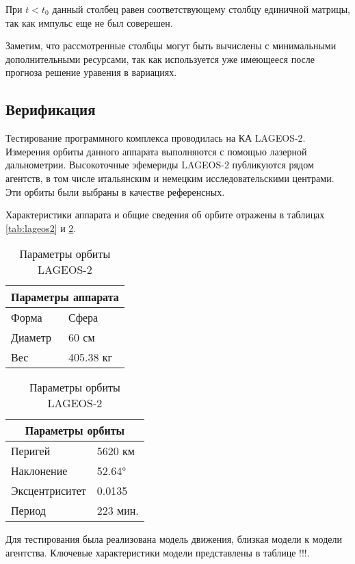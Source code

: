 При $t < t_0$ данный столбец равен соответствующему столбцу единичной матрицы, 
так как импульс еще не был соверешен.

Заметим, что рассмотренные столбцы могут быть вычислены с минимальными дополнительными
ресурсами, так как используется уже имеющееся после прогноза решение уравения в вариациях.

\subsection{Верификация}

Тестирование программного комплекса проводилась на КА LAGEOS-2.
Измерения орбиты данного аппарата выполняются с помощью лазерной дальнометрии.
Высокоточные эфемериды LAGEOS-2 публикуются рядом агентств, 
в том числе итальянским и немецким исследовательскими центрами. Эти орбиты
были выбраны в качестве референсных.

Характеристики аппарата и общие сведения об орбите отражены в таблицах \ref{tab:lageos2}
и \ref{tab:lageos2_orb}.

\begin{table}[h!]
    \centering
    \begin{minipage}[t]{0.48\textwidth}
    \centering
    \begin{tabular}{|l|l|}
    \hline
    \multicolumn{2}{|c|}{\textbf{Параметры аппарата}} \\ \hline
    Форма       & Сфера      \\ \hline
    Диаметр     & 60 см      \\ \hline
    Вес         & 405.38 кг  \\ \hline
    \end{tabular}
    \caption{Параметры аппарата LAGEOS-2}
    \label{tab:lageos2}
    \end{minipage}
    \hfill
    \begin{minipage}[t]{0.48\textwidth}
    \centering
    \begin{tabular}{|l|l|}
    \hline
    \multicolumn{2}{|c|}{\textbf{Параметры орбиты}} \\ \hline
    Перигей        & 5620 км   \\ \hline
    Наклонение     & 52.64°    \\ \hline
    Эксцентриситет & 0.0135    \\ \hline
    Период         & 223 мин.  \\ \hline
    \end{tabular}
    \caption{Параметры орбиты LAGEOS-2}
    \label{tab:lageos2_orb}
    \end{minipage}
\end{table}

Для тестирования была реализована модель движения, близкая модели к модели агентства.
Ключевые характеристики модели представлены в таблице !!!.